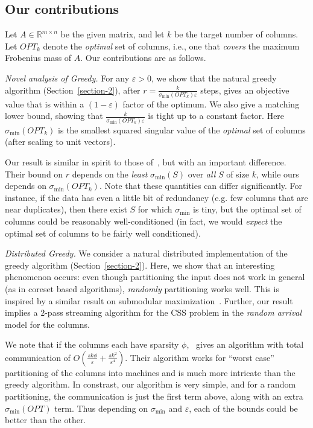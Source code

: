 \documentclass{article}
\newcommand{\Real}{\mathbb{R}}
\newcommand{\eps}{\varepsilon}
\newcommand{\opt}{OPT}
\begin{document}
\subsection{Our contributions}
Let $A \in \Real^{m \times n}$ be the given matrix, and let $k$ be the target number of columns. Let $\opt_k$ denote the {\em optimal} set of columns, i.e., one that {\em covers} the maximum Frobenius mass of $A$. Our contributions are as follows.

{\em Novel analysis of Greedy.} For any $\eps > 0$, we show that the natural greedy algorithm (Section~\ref{section-2}), after $r = \frac{k}{\sigma_{\min}(\opt_k) \eps}$ steps, gives an objective value that is within a $(1-\eps)$  factor of the optimum. We also give a matching lower bound, showing that $\frac{k}{\sigma_{\min}(\opt_k) \eps}$ is tight up to a constant factor. Here $\sigma_{\min}(\opt_k)$ is the smallest squared singular value of the {\em optimal} set of columns (after scaling to unit vectors).

Our result is similar in spirit to those of~\cite{Civril1, Liberty}, but with an important difference. Their bound on $r$ depends on the {\em least} $\sigma_{\min}(S)$ over \textit{all} $S$ of size $k$, while ours depends on $\sigma_{\min}(\opt_k)$. Note that these quantities can differ significantly. For instance, if the data has even a little bit of redundancy (e.g. few columns that are near duplicates), then there exist $S$ for which $\sigma_{\min}$ is tiny, but the optimal set of columns could be reasonably well-conditioned (in fact, we would {\em expect} the optimal set of columns to be fairly well conditioned).



{\em Distributed Greedy.} We consider a natural distributed implementation of the greedy algorithm (Section~\ref{section-2}). Here, we show that an interesting phenomenon occurs: even though partitioning the input does not work in general (as in coreset based algorithms), {\em randomly} partitioning works well. This is inspired by a similar result on submodular maximization~\cite{Mirrokni}. Further, our result implies a $2$-pass streaming algorithm for the CSS problem in the {\em random arrival} model for the columns.



We note that if the columns each have sparsity $\phi$,~\cite{Boutsidis2015} gives an algorithm with total communication of $O(\frac{sk\phi}{\eps} + \frac{sk^2}{\eps^4})$. Their algorithm works for ``worst case'' partitioning of the columns into machines and is much more intricate than the greedy algorithm. In constrast, our algorithm is very simple, and for a random partitioning, the communication is just the first term above, along with an extra $\sigma_{\min}(\opt)$ term. Thus depending on $\sigma_{\min}$ and $\eps$, each of the bounds could be better than the other.
\end{document}
